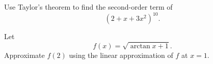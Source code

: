 \begin{problem}
\begin{problemsubparts}
\item Use Taylor's theorem to find the second-order term of
\[
(2+x+3x^2)^{10}.
\]
\item Let
\[
f(x)=\sqrt{\arctan x+1}.
\]
Approximate $f(2)$ using the linear approximation of $f$ at $x=1$.
\end{problemsubparts}
\end{problem}

